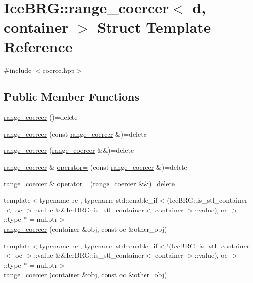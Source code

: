 \hypertarget{structIceBRG_1_1range__coercer}{}\section{Ice\+B\+R\+G\+:\+:range\+\_\+coercer$<$ d, container $>$ Struct Template Reference}
\label{structIceBRG_1_1range__coercer}


{\ttfamily \#include $<$coerce.\+hpp$>$}

\subsection*{Public Member Functions}
\begin{DoxyCompactItemize}
\item 
\hyperlink{structIceBRG_1_1range__coercer_a5901636b4d62f2246e335b573dc9e199}{range\+\_\+coercer} ()=delete
\item 
\hyperlink{structIceBRG_1_1range__coercer_a660a2c7286b2f13fdd6f5632ec3c3327}{range\+\_\+coercer} (const \hyperlink{structIceBRG_1_1range__coercer}{range\+\_\+coercer} \&)=delete
\item 
\hyperlink{structIceBRG_1_1range__coercer_a768afca9c348a0ea364449c46d89daa4}{range\+\_\+coercer} (\hyperlink{structIceBRG_1_1range__coercer}{range\+\_\+coercer} \&\&)=delete
\item 
\hyperlink{structIceBRG_1_1range__coercer}{range\+\_\+coercer} \& \hyperlink{structIceBRG_1_1range__coercer_af3c6dff0d90637b2a5362718992fd1ae}{operator=} (const \hyperlink{structIceBRG_1_1range__coercer}{range\+\_\+coercer} \&)=delete
\item 
\hyperlink{structIceBRG_1_1range__coercer}{range\+\_\+coercer} \& \hyperlink{structIceBRG_1_1range__coercer_ab08ad40ab88b03ef4928e72bf4d0db80}{operator=} (\hyperlink{structIceBRG_1_1range__coercer}{range\+\_\+coercer} \&\&)=delete
\item 
{\footnotesize template$<$typename oc , typename std\+::enable\+\_\+if$<$(\+Ice\+B\+R\+G\+::is\+\_\+stl\+\_\+container$<$ oc $>$\+::value \&\&\+Ice\+B\+R\+G\+::is\+\_\+stl\+\_\+container$<$ container $>$\+::value), oc $>$\+::type $\ast$  = nullptr$>$ }\\\hyperlink{structIceBRG_1_1range__coercer_ac210911ef260ab17c06f6257ba13baf6}{range\+\_\+coercer} (container \&obj, const oc \&other\+\_\+obj)
\item 
{\footnotesize template$<$typename oc , typename std\+::enable\+\_\+if$<$!(\+Ice\+B\+R\+G\+::is\+\_\+stl\+\_\+container$<$ oc $>$\+::value \&\&\+Ice\+B\+R\+G\+::is\+\_\+stl\+\_\+container$<$ container $>$\+::value), oc $>$\+::type $\ast$  = nullptr$>$ }\\\hyperlink{structIceBRG_1_1range__coercer_ac210911ef260ab17c06f6257ba13baf6}{range\+\_\+coercer} (container \&obj, const oc \&other\+\_\+obj)
\end{DoxyCompactItemize}


